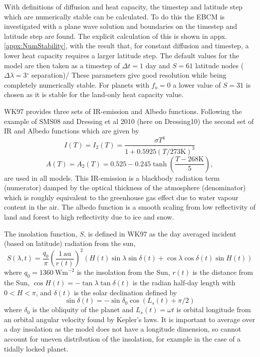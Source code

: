 \documentclass[12pt, onecolumn]{revtex4-2}    %
\newcommand{\degrees}{\ensuremath{^{\circ}}}
\begin{document}
With definitions of diffusion and heat capacity, the timestep and latitude step which are numerically stable can be calculated.
To do this the EBCM is investigated with a plane wave solution and boundaries on the timestep and latitude step are found.
The explicit calculation of this is shown in appx. \ref{appx:NumStability}, with the result that, for constant diffusion and timestep, a lower heat capacity requires a larger latitude step.
The default values for the model are then taken as a timestep of $\Delta t = 1$ day and $S = 61$ latitude nodes ($\Delta \lambda = 3\degrees$ separation)/
These parameters give good resolution while being completely numerically stable.
For planets with $f_\text{o} = 0$ a lower value of $S=31$ is chosen as it is stable for the land-only heat capacity value.

WK97 provides three sets of IR-emission and Albedo functions. Following the example of SMS08 and Dressing et al 2010 (here on Dressing10) \cite{Dressing10} the second set of IR and Albedo functions which are given by
\begin{equation}
  I(T) = I_2(T) = \frac{\sigma T^4}{1 + 0.5925 (T / 273 \text{K}) ^ 3}
\end{equation}
\begin{equation}
  A(T) = A_2(T) = 0.525 - 0.245 \tanh\left(\frac{T - 268 \text{K}}{5}\right),
\end{equation}
are used in all models.
This IR-emission is a blackbody radiation term (numerator) damped by the optical thickness of the atmosphere (denominator) which is roughly equivalent to the greenhouse gas effect due to water vapour content in the air.
The albedo function is a smooth scaling from low reflectivity of land and forest to high reflectivity due to ice and snow.

The insolation function, $S$, is defined in WK97 as the day averaged incident (based on latitude) radiation from the sun,
$$
  S(\lambda, t) = \frac{q_0}{\pi} \left(\frac{1 \ \text{au}}{r(t)}\right)^2 (H(t) \sin{\lambda} \sin{\delta(t)} + \cos{\lambda} \cos{\delta(t)} \sin{H(t)})
$$
where $q_0=1360 \ \text{Wm}^{-2}$ is the insolation from the Sun,
$r(t)$ is the distance from the Sun,
$\cos H(t) = -\tan \lambda \tan \delta(t)$ is the radian half-day length with $0 < H < \pi$,
and $\delta(t)$ is the solar declination defined by
$$
  \sin \delta(t) = -\sin \delta_0 \cos(L_s(t) + \pi/2)
$$
where $\delta_0$ is the obliquity of the planet and $L_s(t) = \omega t$ is orbital longitude from an orbital angular velocity found by Kepler's laws.
It is important to average over a day insolation as the model does not have a longitude dimension, so cannot account for uneven distribution of the insolation, for example in the case of a tidally locked planet.
\end{document}
